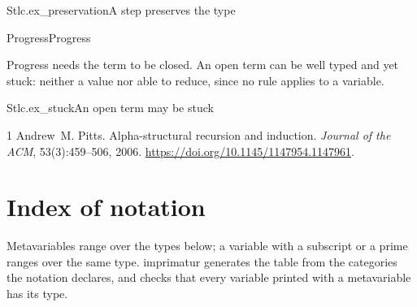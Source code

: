 \documentclass{article}
\begin{document}
\begin{leanexample}[sum=LuQF7rf3rY]{Stlc.ex_preservation}{A step preserves the type}
\label{ex:Stlc.ex_preservation}
\end{leanexample}

\begin{leantheorem}[sum=CxgvvaS6H8]{Progress}{Progress}
\label{thm:Progress}
\end{leantheorem}

Progress needs the term to be closed. An open term can be well typed and yet
stuck: neither a value nor able to reduce, since no rule applies to a
variable.

\begin{leanexample}[sum=atC6biB2FK]{Stlc.ex_stuck}{An open term may be stuck}
\label{ex:Stlc.ex_stuck}
\end{leanexample}

\begin{thebibliography}{1}
Andrew~M. Pitts.
\newblock Alpha-structural recursion and induction.
\newblock \emph{Journal of the ACM}, 53(3):459--506, 2006.
\newblock \url{https://doi.org/10.1145/1147954.1147961}.
\end{thebibliography}

\appendix
\section{Index of notation}\label{app:notation}

Metavariables range over the types below; a variable with a subscript or a
prime ranges over the same type. imprimatur generates the table from the
categories the notation declares, and checks that every variable printed with
a metavariable has its type.
\end{document}
